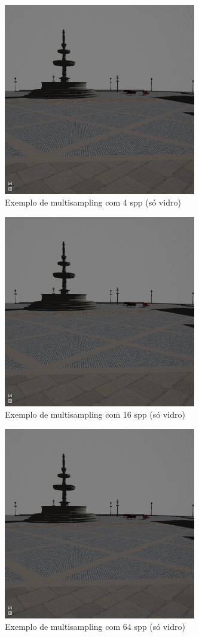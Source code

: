 \documentclass[10pt]{article}
\begin{document}
\begin{figure}[H]
    \centering
    \includegraphics[width=3.3in]{selective_multisampling_4rpp_reflections.jpg}
    \caption{Exemplo de multisampling com 4 spp (só vidro)}
\end{figure}

\begin{figure}[H]
    \centering
    \includegraphics[width=3.3in]{selective_multisampling_16rpp_spec.jpg}
    \caption{Exemplo de multisampling com 16 spp (só vidro)}
\end{figure}

\begin{figure}[H]
    \centering
    \includegraphics[width=3.3in]{selective_multisampling_64rpp.jpg}
    \caption{Exemplo de multisampling com 64 spp (só vidro)}
\end{figure}
\end{document}
